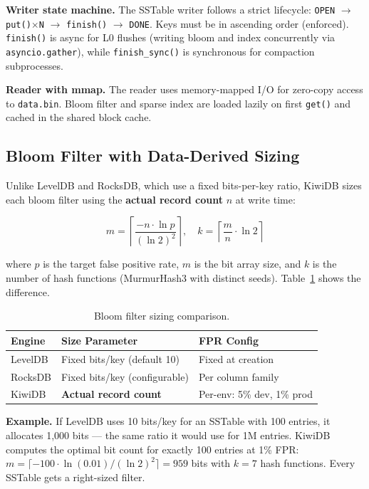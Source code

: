 \documentclass[conference]{IEEEtran}
\begin{document}
\textbf{Writer state machine.} The SSTable writer follows a strict lifecycle: \texttt{OPEN} $\rightarrow$ \texttt{put()$\times$N} $\rightarrow$ \texttt{finish()} $\rightarrow$ \texttt{DONE}. Keys must be in ascending order (enforced). \texttt{finish()} is async for L0 flushes (writing bloom and index concurrently via \texttt{asyncio.gather}), while \texttt{finish\_sync()} is synchronous for compaction subprocesses.

\textbf{Reader with mmap.} The reader uses memory-mapped I/O for zero-copy access to \texttt{data.bin}. Bloom filter and sparse index are loaded lazily on first \texttt{get()} and cached in the shared block cache.

\subsection{Bloom Filter with Data-Derived Sizing}

Unlike LevelDB and RocksDB, which use a fixed bits-per-key ratio, KiwiDB sizes each bloom filter using the \textbf{actual record count} $n$ at write time:

\begin{equation}
m = \left\lceil \frac{-n \cdot \ln p}{(\ln 2)^2} \right\rceil, \quad
k = \left\lceil \frac{m}{n} \cdot \ln 2 \right\rceil
\end{equation}

where $p$ is the target false positive rate, $m$ is the bit array size, and $k$ is the number of hash functions (MurmurHash3 with distinct seeds). Table~\ref{tab:bloom-comparison} shows the difference.

\begin{table}[t]
\centering
\caption{Bloom filter sizing comparison.}
\label{tab:bloom-comparison}
\begin{tabular}{@{}lll@{}}
\toprule
\textbf{Engine} & \textbf{Size Parameter} & \textbf{FPR Config} \\
\midrule
LevelDB & Fixed bits/key (default 10) & Fixed at creation \\
RocksDB & Fixed bits/key (configurable) & Per column family \\
KiwiDB & \textbf{Actual record count} & Per-env: 5\% dev, 1\% prod \\
\bottomrule
\end{tabular}
\end{table}

\textbf{Example.} If LevelDB uses 10 bits/key for an SSTable with 100 entries, it allocates 1,000 bits --- the same ratio it would use for 1M entries. KiwiDB computes the optimal bit count for exactly 100 entries at 1\% FPR: $m = \lceil -100 \cdot \ln(0.01) / (\ln 2)^2 \rceil = 959$ bits with $k = 7$ hash functions. Every SSTable gets a right-sized filter.
\end{document}
